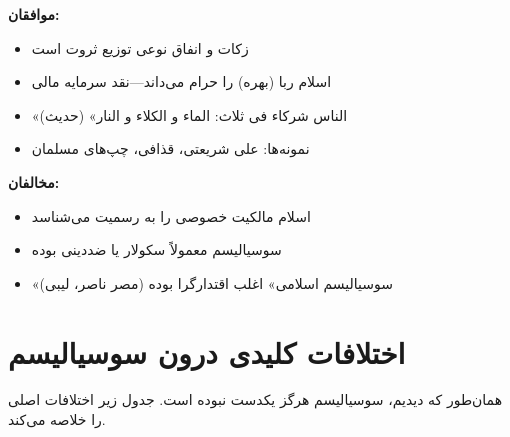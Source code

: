 \begin{debatebox}
\textbf{موافقان:}
\begin{itemize}[nosep]
    \item زکات و انفاق نوعی توزیع ثروت است
    \item اسلام ربا (بهره) را حرام می‌داند—نقد سرمایه مالی
    \item «الناس شرکاء فی ثلاث: الماء و الکلاء و النار» (حدیث)
    \item نمونه‌ها: علی شریعتی، قذافی، چپ‌های مسلمان
\end{itemize}

\textbf{مخالفان:}
\begin{itemize}[nosep]
    \item اسلام مالکیت خصوصی را به رسمیت می‌شناسد
    \item سوسیالیسم معمولاً سکولار یا ضددینی بوده
    \item «سوسیالیسم اسلامی» اغلب اقتدارگرا بوده (مصر ناصر، لیبی)
\end{itemize}
\end{debatebox}

\section{اختلافات کلیدی درون سوسیالیسم}

همان‌طور که دیدیم، سوسیالیسم هرگز یکدست نبوده است. جدول زیر اختلافات اصلی را خلاصه می‌کند.


